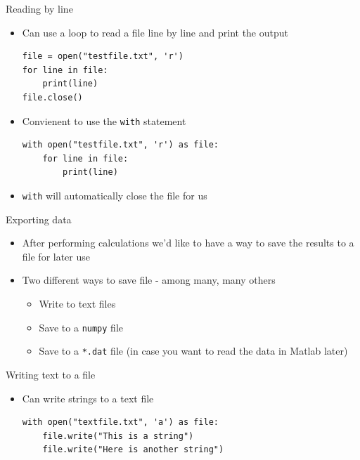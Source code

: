 \documentclass[11pt,professionalfonts]{beamer}
\begin{document}
\begin{frame}[fragile]{Reading by line}
    \begin{itemize}
        \item Can use a loop to read a file line by line and print the output
            \begin{verbatim}
file = open("testfile.txt", 'r')
for line in file:
    print(line)
file.close()
            \end{verbatim}
        \item Convienent to use the \texttt{with} statement
            \begin{verbatim}
with open("testfile.txt", 'r') as file:
    for line in file:
        print(line)
            \end{verbatim}
        \item \texttt{with} will automatically close the file for us
    \end{itemize}
\end{frame}

\begin{frame}[fragile]{Exporting data}
    \begin{itemize}
        \item After performing calculations we'd like to have a way to save the results to a file for later use
        \item Two different ways to save file - among many, many others
            \begin{itemize}
                \item Write to text files
                \item Save to a \texttt{numpy} file 
                \item Save to a \texttt{*.dat} file (in case you want to read the data in Matlab later) 
            \end{itemize}
    \end{itemize}
\end{frame}

\begin{frame}[fragile]{Writing text to a file}
    \begin{itemize}
        \item Can write strings to a text file
            \begin{verbatim}
with open("textfile.txt", 'a') as file:
    file.write("This is a string")
    file.write("Here is another string")
            \end{verbatim}
    \end{itemize}
\end{frame}
\end{document}
